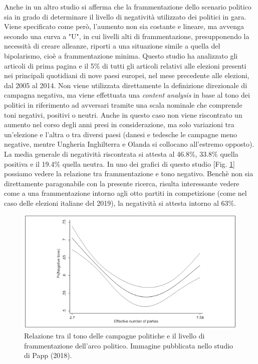 Anche in un altro studio \citep{papp2018} si afferma che la frammentazione dello scenario politico sia in grado di determinare il livello di negatività utilizzato dei politici in gara. Viene specificato come però, l'aumento non sia costante e lineare, ma avvenga secondo una curva a "U", in cui livelli alti di frammentazione, presupponendo la necessità di creare alleanze, riporti a una situazione simile a quella del bipolarismo, cioè a frammentazione   minima. Questo studio  ha analizzato gli articoli di prima pagina e il 5\% di tutti gli articoli relativi alle elezioni presenti nei principali quotidiani di nove paesi europei, nel mese precedente alle elezioni, dal 2005 al 2014. Non viene utilizzata direttamente la definizione direzionale di campagna negativa, ma viene effettuata una \textit{content analysis} in base al tono dei politici in riferimento ad avversari tramite una scala nominale che comprende toni negativi, positivi o neutri. Anche in questo caso non viene riscontrato un aumento nel corso degli anni presi in considerazione, ma solo variazioni tra un'elezione e l'altra o tra diversi paesi (danesi e tedesche le campagne meno negative, mentre Ungheria Inghilterra e Olanda si collocano all'estremo opposto). La media generale di negatività riscontrata si attesta al 46.8\%, 33.8\% quella positiva e il 19.4\% quella neutra. In uno dei grafici di questo studio [Fig. \ref{fig:negativau}] possiamo vedere la relazione tra frammentazione e tono negativo. Benchè non sia direttamente paragonabile con la presente ricerca, risulta interessante vedere come a una frammentazione intorno agli otto partiti in competizione (come nel caso delle elezioni italiane del 2019), la negatività si attesta intorno al 63\%.
\begin{figure}
	\includegraphics[width=\textwidth]{figures/negativau}
	\caption{Relazione tra il tono delle campagne politiche e il livello di frammentazione dell'arco politico. Immagine pubblicata nello studio di Papp (2018).}
	\label{fig:negativau}
\end{figure}

